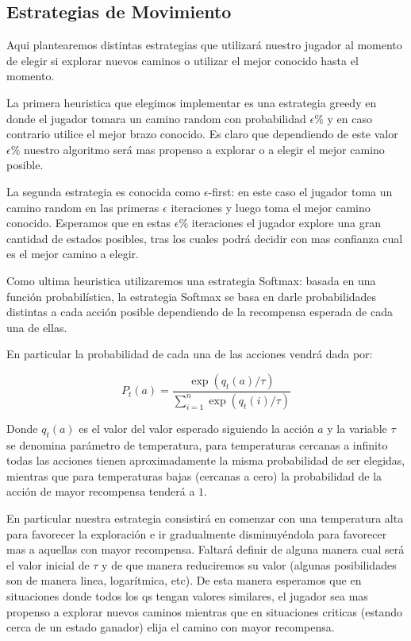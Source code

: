 \subsection{Estrategias de Movimiento}

Aqui plantearemos distintas estrategias que utilizará nuestro jugador al momento de elegir si explorar nuevos caminos o utilizar el mejor conocido hasta el momento.

La primera heuristica que elegimos implementar es una estrategia greedy en donde el jugador tomara un camino random con probabilidad $\epsilon\%$ y en caso contrario utilice el mejor brazo conocido. Es claro que dependiendo de este valor $\epsilon\%$ nuestro algoritmo será mas propenso a explorar o a elegir el mejor camino posible.

La segunda estrategia es conocida como $\epsilon$-first: en este caso el jugador toma un camino random en las primeras $\epsilon$ iteraciones y luego toma el mejor camino conocido. Esperamos que en estas $\epsilon\%$ iteraciones el jugador explore una gran cantidad de estados posibles, tras los cuales podrá decidir con mas confianza cual es el mejor camino a elegir.

Como ultima heuristica utilizaremos una estrategia Softmax: basada en una función probabilística, la estrategia Softmax se basa en darle probabilidades distintas a cada acción posible dependiendo de la recompensa esperada de cada una de ellas.

En particular la probabilidad de cada una de las acciones vendrá dada por:

$$P_t(a) = \frac{\exp(q_t(a)/\tau)}{\sum_{i=1}^n\exp(q_t(i)/\tau)}$$

Donde $q_t(a)$ es el valor del valor esperado siguiendo la acción $a$ y la variable $\tau$ se denomina parámetro de temperatura, para temperaturas cercanas a infinito todas las acciones tienen aproximadamente la misma probabilidad de ser elegidas, mientras que para temperaturas bajas (cercanas a cero) la probabilidad de la acción de mayor recompensa tenderá a $1$.

En particular nuestra estrategia consistirá en comenzar con una temperatura alta para favorecer la exploración e ir gradualmente disminuyéndola para favorecer mas a aquellas con mayor recompensa. Faltará definir de alguna manera cual será el valor inicial de $\tau$ y de que manera reduciremos su valor (algunas posibilidades son de manera linea, logarítmica, etc). De esta manera esperamos que en situaciones donde todos los qs tengan valores similares, el jugador sea mas propenso a explorar nuevos caminos mientras que en situaciones criticas (estando cerca de un estado ganador) elija el camino con mayor recompensa.

